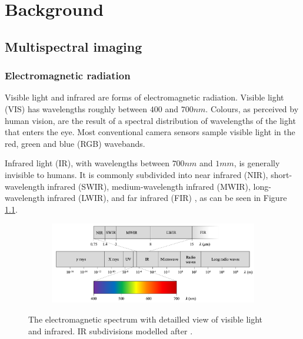 \documentclass{l4proj}
\begin{document}
\chapter{Background}
\label{background}

\section{Multispectral imaging}
\label{imaging}

\subsection{Electromagnetic radiation}

Visible light and infrared are forms of electromagnetic radiation. Visible light (VIS) has wavelengths roughly between $400$ and $700 nm$. Colours, as perceived by human vision, are the result of a spectral distribution of wavelengths of the light that enters the eye. Most conventional camera sensors sample visible light in the red, green and blue (RGB) wavebands.

Infrared light (IR), with wavelengths between $700 nm$ and $1 mm$, is generally invisible to humans. It is commonly subdivided into near infrared (NIR), short-wavelength infrared (SWIR), medium-wavelength infrared (MWIR), long-wavelength infrared (LWIR), and far infrared (FIR) \citep[p. 28]{byrnes_unexploded_2008}, as can be seen in Figure \ref{fig:em_spectrum}.

\begin{figure}[ht]
  \centering
  \begin{subfigure}[h!]{0.8\textwidth}
    \includegraphics[width=\textwidth]{images/EM_spectrum.png}
  \end{subfigure}
  \caption{The electromagnetic spectrum with detailled view of visible light and infrared. IR subdivisions modelled after \citet[p. 28]{byrnes_unexploded_2008}.}
  \label{fig:em_spectrum}
\end{figure}
\end{document}
